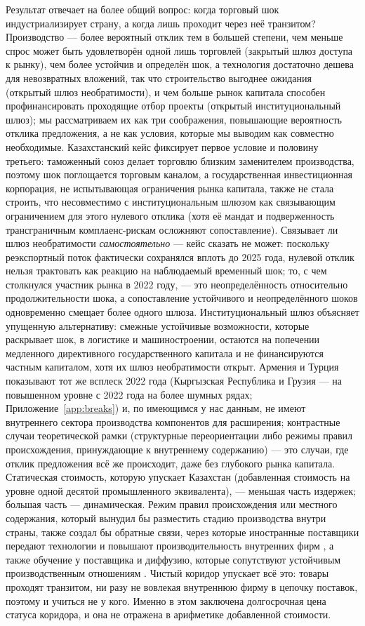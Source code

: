 \documentclass[12pt]{article}
\begin{document}
Результат отвечает на более общий вопрос: когда торговый шок индустриализирует страну, а
когда лишь проходит через неё транзитом? Производство — более вероятный отклик тем в
большей степени, чем меньше спрос может быть удовлетворён одной лишь торговлей (закрытый
шлюз доступа к рынку), чем более устойчив и определён шок, а технология достаточно дешева
для невозвратных вложений, так что строительство выгоднее ожидания (открытый шлюз
необратимости), и чем больше рынок капитала способен профинансировать проходящие отбор
проекты (открытый институциональный шлюз); мы рассматриваем их как три соображения,
повышающие вероятность отклика предложения, а не как условия, которые мы выводим как
совместно необходимые. Казахстанский кейс фиксирует первое условие и половину третьего:
таможенный союз делает торговлю близким заменителем производства, поэтому шок поглощается
торговым каналом, а государственная инвестиционная корпорация, не испытывающая ограничения
рынка капитала, также не стала строить, что несовместимо с институциональным шлюзом как
связывающим ограничением для этого нулевого отклика (хотя её мандат и подверженность
трансграничным комплаенс-рискам осложняют сопоставление). Связывает ли шлюз необратимости
\emph{самостоятельно} — кейс сказать не может: поскольку реэкспортный поток фактически
сохранялся вплоть до 2025 года, нулевой отклик нельзя трактовать как реакцию на
наблюдаемый временный шок; то, с чем столкнулся участник рынка в 2022 году, — это
неопределённость относительно продолжительности шока, а сопоставление устойчивого и
неопределённого шоков одновременно смещает более одного шлюза. Институциональный шлюз
объясняет упущенную альтернативу: смежные устойчивые возможности, которые раскрывает шок, в
логистике и машиностроении, остаются на попечении медленного директивного государственного
капитала и не финансируются частным капиталом, хотя их шлюз необратимости открыт. Армения и
Турция показывают тот же всплеск 2022 года (Кыргызская Республика и Грузия — на повышенном
уровне с 2022 года на более шумных рядах; Приложение~\ref{app:breaks}) и, по имеющимся у нас
данным, не имеют внутреннего сектора производства компонентов для расширения; контрастные
случаи теоретической рамки (структурные переориентации либо режимы правил происхождения,
принуждающие к внутреннему содержанию) — это случаи, где отклик предложения всё же
происходит, даже без глубокого рынка капитала. Статическая стоимость, которую упускает
Казахстан (добавленная стоимость на уровне одной десятой промышленного эквивалента), —
меньшая часть издержек; большая часть — динамическая. Режим правил происхождения или
местного содержания, который вынудил бы разместить стадию производства внутри страны, также
создал бы обратные связи, через которые иностранные поставщики передают технологии и
повышают производительность внутренних фирм \citep{javorcik2004spillovers}, а также обучение
у поставщика и диффузию, которые сопутствуют устойчивым производственным отношениям
\citep{desouza2024diffusion}. Чистый коридор упускает всё это: товары проходят транзитом, ни
разу не вовлекая внутреннюю фирму в цепочку поставок, поэтому и учиться не у кого. Именно в
этом заключена долгосрочная цена статуса коридора, и она не отражена в арифметике
добавленной стоимости.
\end{document}
